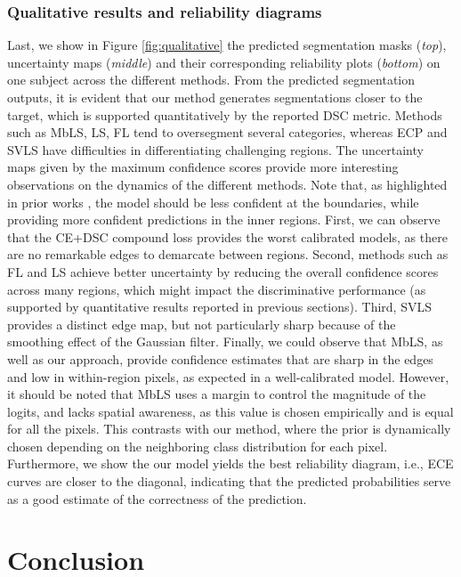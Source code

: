 \documentclass[twocolumn,final,10pt]{elsarticle}
\newcommand{\rev}[1]{{\color{black}#1}}
\begin{document}
\subsubsection{Qualitative results and reliability diagrams}
\rev{Last, we show in Figure \ref{fig:qualitative} the predicted segmentation masks (\textit{top}), uncertainty maps (\textit{middle}) and their corresponding reliability plots (\textit{bottom}) on one subject across the different methods. From the predicted segmentation outputs, it is evident that our method generates segmentations closer to the target, which is supported quantitatively by the reported DSC metric. Methods such as MbLS, LS, FL tend to oversegment several categories, whereas ECP and SVLS have difficulties in differentiating challenging regions. The uncertainty maps given by the maximum confidence scores provide more interesting observations on the dynamics of the different methods. Note that, as highlighted in prior works \citep{liu2022devil}, the model should be less confident at the boundaries, while providing more confident predictions in the inner regions. First, we can observe that the CE+DSC compound loss provides the worst calibrated models, as there are no remarkable edges to demarcate between regions. Second, methods such as FL and LS achieve better uncertainty by reducing the overall confidence scores across many regions, which might impact the discriminative performance (as supported by quantitative results reported in previous sections). Third, SVLS provides a distinct edge map, but not particularly sharp because of the smoothing effect of the Gaussian filter. Finally, we could observe that MbLS, as well as our approach, provide confidence estimates that are sharp in the edges and low in within-region pixels, as expected in a well-calibrated model. However, it should be noted that MbLS uses a margin to control the magnitude of the logits, and lacks spatial awareness, as this value is chosen empirically and is equal for all the pixels. This contrasts with our method, where the prior is dynamically chosen depending on the neighboring class distribution for each pixel. Furthermore, we show the our model yields the best reliability diagram, i.e., ECE curves are closer to the diagonal, indicating that the predicted probabilities serve as a good estimate of the correctness of the prediction.}

\section{Conclusion}
\end{document}

